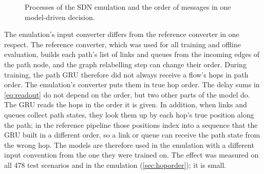 \begin{figure}[ht]
\centering
{}
\caption{Processes of the SDN emulation and the order of messages in one model-driven decision.}
\label{fig:emu-arch}
\end{figure}

The emulation's input converter differs from the reference converter in one respect. The reference converter, which was used for all training and offline evaluation, builds each path's list of links and queues from the incoming edges of the path node, and the graph relabelling step can change their order. During training, the path GRU therefore did not always receive a flow's hops in path order. The emulation's converter puts them in true hop order. The delay sums in \cref{eq:readout} do not depend on the order, but two other parts of the model do. The GRU reads the hops in the order it is given. In addition, when links and queues collect path states, they look them up by each hop's true position along the path; in the reference pipeline those positions index into a sequence that the GRU built in a different order, so a link or queue can receive the path state from the wrong hop. The models are therefore used in the emulation with a different input convention from the one they were trained on. The effect was measured on all 478 test scenarios and in the emulation (\cref{sec:hoporder}); it is small.

